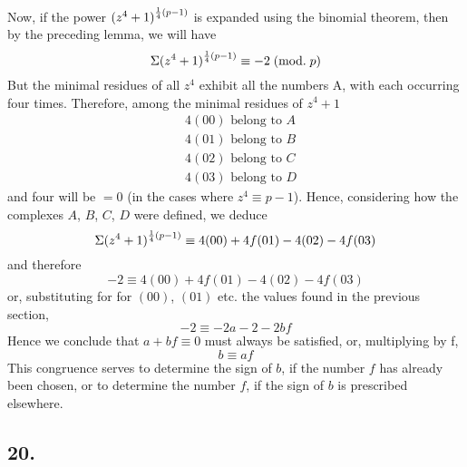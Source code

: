 \documentclass[twoside,12pt]{memoir}
\renewcommand{\pmod}[1]{\;(\textrm{mod.}\;#1)}
\let\oldfrac\frac
\def\frac#1#2{\mathchoice{\tfrac{#1}{#2}}{\oldfrac{#1}{#2}}{\genfrac{}{}{}{2}{#1}{#2\mathstrut}}{\genfrac{}{}{}{3}{#1}{#2\mathstrut}}}
\begin{document}
Now, if the power \((z^{4}+1)^{\frac{1}{4}(p-1)}\) is expanded using the binomial theorem, then by the preceding lemma, we will have
\[\Sigma(z^{4}+1)^{\frac{1}{4}(p-1)} \equiv-2\pmod{p}\]
But the minimal residues of all \(z^{4}\) exhibit all the numbers A, with each occurring four times. Therefore, among the minimal residues of \(z^{4}+1\)
\[\begin{aligned}
& 4(00) \text{ belong to } A \\
& 4(01) \text{ belong to } B \\
& 4(02) \text{ belong to } C \\
& 4(03) \text{ belong to } D
\end{aligned}\]
and four will be \(=0\) (in the cases where \(z^{4} \equiv p-1\)). Hence, considering how the complexes \(A\), \(B\), \(C\), \(D\) were defined, we deduce
\[\Sigma(z^{4}+1)^{\frac{1}{4}(p-1)} \equiv 4(00)+4 f(01)-4(02)-4 f(03)\]
and therefore
\[-2 \equiv 4(00)+4 f(01)-4(02)-4 f(03)\]
or, substituting for for \((00)\), \((01)\) etc{.} the values found in the previous section,
\[-2 \equiv-2 a-2-2 b f\]
Hence we conclude that \(a+b f \equiv 0 \) must always be satisfied, or, multiplying by f,
\[b \equiv a f\]
This congruence serves to determine the sign of \(b\), if the number \(f\) has already been chosen, or to determine the number \(f\), if the sign of \(b\) is prescribed elsewhere.
%

\subsection*{20.}
\end{document}
